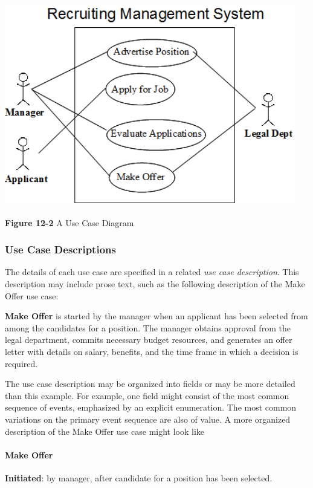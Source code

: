 \bigskip

\includegraphics[width=5.0in,height=3.5in]{ub-img/usecase2.png}

{\sffamily\bfseries Figure 12-2}
{\sffamily A Use Case Diagram}

\bigskip

\subsubsection{Use Case Descriptions}

The details of each use case are specified in a related \textit{use case
description}. This description may include prose text, such as the
following description of the {\textquotedbl}Make Offer{\textquotedbl}
use case:

\textbf{Make Offer} is started by the manager when an applicant has been
selected from among the candidates for a position. The manager obtains
approval from the legal department, commits necessary budget resources,
and generates an offer letter with details on salary, benefits, and the
time frame in which a decision is required.

The use case description may be organized into fields or may be more
detailed than this example. For example, one field might consist of the
most common sequence of events, emphasized by an explicit enumeration.
The most common variations on the primary event sequence are also of
value. A more organized description of the Make Offer use case might
look like

\paragraph[Make Offer]{\bfseries Make Offer}
\textbf{Initiated}: by manager, after candidate for a position has been
selected.

